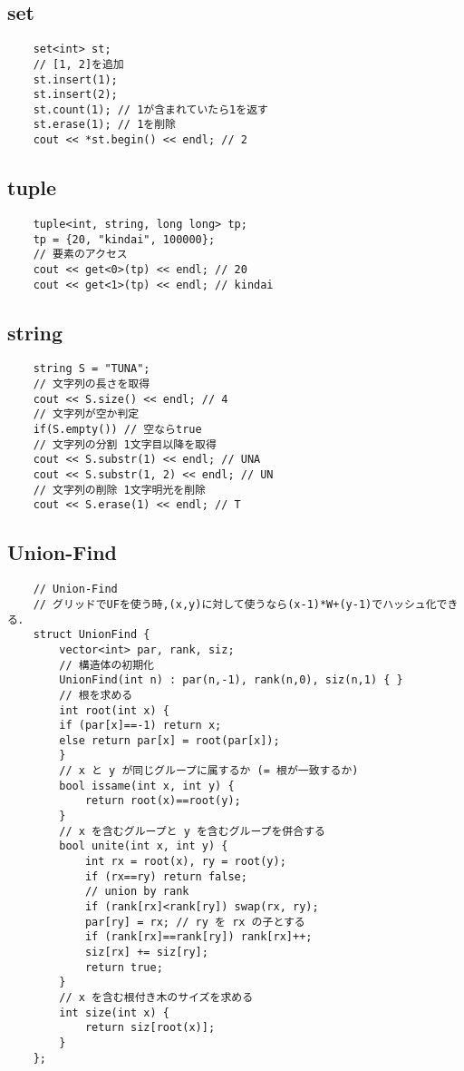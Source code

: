 \documentclass[a4paper, landscape, 9pt]{jarticle} %
\begin{document}
\begin{multicols*}{3}
    \subsection{set}
    \begin{lstlisting}
    set<int> st;
    // [1, 2]を追加
    st.insert(1);
    st.insert(2);
    st.count(1); // 1が含まれていたら1を返す
    st.erase(1); // 1を削除
    cout << *st.begin() << endl; // 2
    \end{lstlisting}

    \subsection{tuple}
    \begin{lstlisting}
    tuple<int, string, long long> tp;
    tp = {20, "kindai", 100000};
    // 要素のアクセス
    cout << get<0>(tp) << endl; // 20
    cout << get<1>(tp) << endl; // kindai
    \end{lstlisting}

    \subsection{string}
    \begin{lstlisting}
    string S = "TUNA";
    // 文字列の長さを取得
    cout << S.size() << endl; // 4
    // 文字列が空か判定
    if(S.empty()) // 空ならtrue
    // 文字列の分割 1文字目以降を取得
    cout << S.substr(1) << endl; // UNA
    cout << S.substr(1, 2) << endl; // UN
    // 文字列の削除 1文字明光を削除
    cout << S.erase(1) << endl; // T

    \end{lstlisting}

    \subsection{Union-Find}
    \begin{lstlisting}
    // Union-Find
    // グリッドでUFを使う時,(x,y)に対して使うなら(x-1)*W+(y-1)でハッシュ化できる．
    struct UnionFind {
        vector<int> par, rank, siz;
        // 構造体の初期化
        UnionFind(int n) : par(n,-1), rank(n,0), siz(n,1) { }
        // 根を求める
        int root(int x) {
        if (par[x]==-1) return x;
        else return par[x] = root(par[x]);
        }
        // x と y が同じグループに属するか (= 根が一致するか)
        bool issame(int x, int y) {
            return root(x)==root(y);
        }
        // x を含むグループと y を含むグループを併合する
        bool unite(int x, int y) {
            int rx = root(x), ry = root(y);
            if (rx==ry) return false;
            // union by rank
            if (rank[rx]<rank[ry]) swap(rx, ry);
            par[ry] = rx; // ry を rx の子とする
            if (rank[rx]==rank[ry]) rank[rx]++;
            siz[rx] += siz[ry];
            return true;
        }
        // x を含む根付き木のサイズを求める
        int size(int x) {
            return siz[root(x)];
        }
    };
    

\end{lstlisting}
\end{multicols*}
\end{document}
